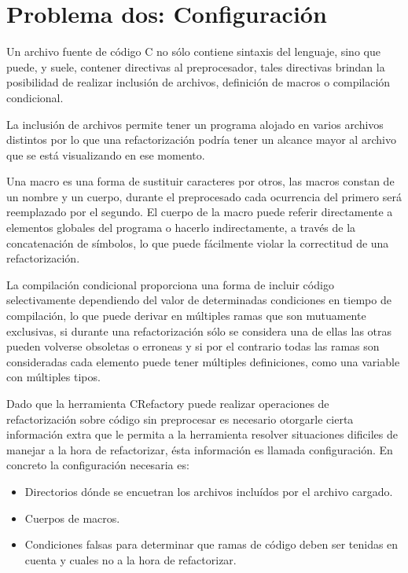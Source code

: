 \documentclass[a4paper,oneside,12pt]{article}
\begin{document}
\section{Problema dos: Configuraci\'on}
\label{sec:problema_dos}

Un archivo fuente de c\'odigo C no s\'olo contiene sintaxis del lenguaje, sino que puede, y suele, contener directivas al preprocesador, tales directivas brindan la posibilidad de realizar inclusi\'on de archivos, definici\'on de macros o compilaci\'on condicional.

La inclusi\'on de archivos permite tener un programa alojado en varios archivos distintos por lo que una refactorizaci\'on podr\'ia tener un alcance mayor al archivo que se est\'a visualizando en ese momento.

Una macro es una forma de sustituir caracteres por otros, las macros constan de un nombre y un cuerpo, durante el preprocesado cada ocurrencia del primero ser\'a reemplazado por el segundo. El cuerpo de la macro puede referir directamente a elementos globales del programa o hacerlo indirectamente, a trav\'es de la concatenaci\'on de s\'imbolos, lo que puede f\'acilmente violar la correctitud de una refactorizaci\'on.

La compilaci\'on condicional proporciona una forma de incluir c\'odigo selectivamente dependiendo del valor de determinadas condiciones en tiempo de compilaci\'on, lo que puede derivar en m\'ultiples ramas que son mutuamente exclusivas, si durante una refactorizaci\'on s\'olo se considera una de ellas las otras pueden volverse obsoletas o erroneas y si por el contrario todas las ramas son consideradas cada elemento puede tener m\'ultiples definiciones, como una variable con m\'ultiples tipos.

Dado que la herramienta CRefactory puede realizar operaciones de refactorizaci\'on sobre c\'odigo sin preprocesar es necesario otorgarle cierta informaci\'on extra que le permita a la herramienta resolver situaciones dificiles de manejar a la hora de refactorizar, \'esta informaci\'on es llamada configuraci\'on. En concreto la configuraci\'on necesaria es:

\begin{itemize}
\item Directorios d\'onde se encuetran los archivos inclu\'idos por el archivo cargado.
\item Cuerpos de macros.
\item Condiciones falsas para determinar que ramas de c\'odigo deben ser tenidas en cuenta y cuales no a la hora de refactorizar.
\end{itemize}
\end{document}
